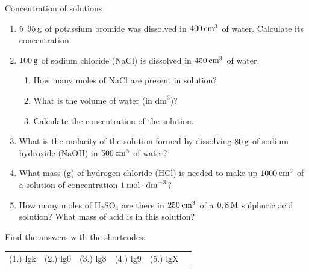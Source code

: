             \begin{exercises}{ Concentration of solutions
      }
            \nopagebreak \noindent
      \label{m38712*id283713}\begin{enumerate}[noitemsep, label=\textbf{\arabic*}. ] 
            \label{m38712*uid92}\item $5,95\phantom{\rule{2pt}{0ex}}\text{g}$ of potassium bromide was dissolved in $400\phantom{\rule{2pt}{0ex}}{\text{cm}}^{3}$ of water. Calculate its concentration.\newline
\label{m38712*uid93}\item $100\phantom{\rule{2pt}{0ex}}\text{g}$ of sodium chloride (NaCl) is dissolved in $450\phantom{\rule{2pt}{0ex}}{\text{cm}}^{3}$ of water.
\label{m38712*id283768}\begin{enumerate}[noitemsep, label=\textbf{\alph*}. ] 
            \label{m38712*uid94}\item How many moles of NaCl are present in solution?
\label{m38712*uid95}\item What is the volume of water (in ${\text{dm}}^{3}$)?
\label{m38712*uid96}\item Calculate the concentration of the solution.
\end{enumerate}
                \label{m38712*uid98}\item What is the molarity of the solution formed by dissolving $80\phantom{\rule{2pt}{0ex}}\text{g}$ of sodium hydroxide ($\text{NaOH}$) in $500\phantom{\rule{2pt}{0ex}}{\text{cm}}^{3}$ of water?\newline
\label{m38712*uid99}\item What mass (g) of hydrogen chloride ($\text{HCl}$) is needed to make up $1000\phantom{\rule{2pt}{0ex}}{\text{cm}}^{3}$ of a solution of concentration $1\phantom{\rule{2pt}{0ex}}\text{mol}\ensuremath{\cdot}{\text{dm}}^{-3}$?\newline
\label{m38712*uid100}\item How many moles of $\text{H}{}_{2}\text{SO}{}_{4}$ are there in $250\phantom{\rule{2pt}{0ex}}{\text{cm}}^{3}$ of a $0,8\phantom{\rule{2pt}{0ex}}\text{M}$ sulphuric acid solution? What mass of acid is in this solution?\newline
\end{enumerate}
    \label{m38712*cid9}
\par {} Find the answers with the shortcodes:
 \par \begin{tabular}[h]{cccccc}
 (1.) lgk  &  (2.) lg0  &  (3.) lg8  &  (4.) lg9  &  (5.) lgX  & \end{tabular}
\end{exercises}
